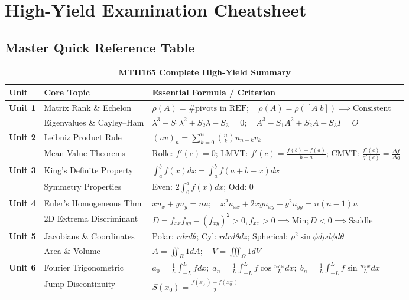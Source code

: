 \chapter{High-Yield Examination Cheatsheet}

\section{Master Quick Reference Table}

\begin{table}[htbp]
\centering
\caption{\textbf{MTH165 Complete High-Yield Summary}}
\vspace{2mm}
\begin{tabularx}{\textwidth}{l p{4cm} X}
\toprule
\textbf{Unit} & \textbf{Core Topic} & \textbf{Essential Formula / Criterion} \\
\midrule
\textbf{Unit 1} & Matrix Rank \& Echelon & $\rho(A) = \text{\# pivots in REF}; \quad \rho(A) = \rho([A|b]) \implies \text{Consistent}$ \\
& Eigenvalues \& Cayley--Ham & $\lambda^3 - S_1\lambda^2 + S_2\lambda - S_3 = 0; \quad A^3 - S_1 A^2 + S_2 A - S_3 I = O$ \\
\addlinespace
\textbf{Unit 2} & Leibniz Product Rule & $(uv)_n = \sum_{k=0}^n \binom{n}{k} u_{n-k} v_k$ \\
& Mean Value Theorems & Rolle: $f'(c)=0$; LMVT: $f'(c) = \frac{f(b)-f(a)}{b-a}$; CMVT: $\frac{f'(c)}{g'(c)} = \frac{\Delta f}{\Delta g}$ \\
\addlinespace
\textbf{Unit 3} & King's Definite Property & $\int_a^b f(x)dx = \int_a^b f(a+b-x)dx$ \\
& Symmetry Properties & Even: $2\int_0^a f(x)dx$; Odd: $0$ \\
\addlinespace
\textbf{Unit 4} & Euler's Homogeneous Thm & $x u_x + y u_y = n u; \quad x^2 u_{xx} + 2xy u_{xy} + y^2 u_{yy} = n(n-1)u$ \\
& 2D Extrema Discriminant & $D = f_{xx}f_{yy} - (f_{xy})^2 > 0, f_{xx} > 0 \implies \text{Min}; D < 0 \implies \text{Saddle}$ \\
\addlinespace
\textbf{Unit 5} & Jacobians \& Coordinates & Polar: $r dr d\theta$; Cyl: $r dr d\theta dz$; Spherical: $\rho^2 \sin\phi d\rho d\phi d\theta$ \\
& Area \& Volume & $A = \iint_R 1 dA; \quad V = \iiint_\Omega 1 dV$ \\
\addlinespace
\textbf{Unit 6} & Fourier Trigonometric & $a_0 = \frac{1}{L}\int_{-L}^L f dx; \; a_n = \frac{1}{L}\int_{-L}^L f \cos\frac{n\pi x}{L} dx; \; b_n = \frac{1}{L}\int_{-L}^L f \sin\frac{n\pi x}{L} dx$ \\
& Jump Discontinuity & $S(x_0) = \frac{f(x_0^+) + f(x_0^-)}{2}$ \\
\bottomrule
\end{tabularx}
\end{table}
